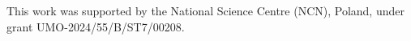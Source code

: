 This work was supported by the National Science Centre (NCN), Poland, under grant UMO-2024/55/B/ST7/00208.